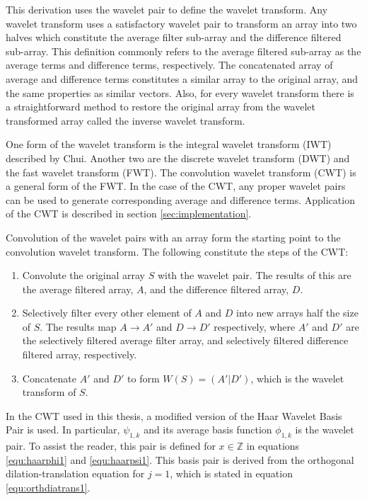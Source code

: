 This derivation uses the wavelet pair to define the wavelet transform.
Any wavelet transform uses a satisfactory wavelet pair to transform an
array into two halves which constitute the average filter sub-array
and the difference filtered sub-array.  This definition commonly
refers to the average filtered sub-array as the average terms and
difference terms, respectively.  The concatenated array of average and
difference terms constitutes a similar array to the original array,
and the same properties as similar vectors.  Also, for every wavelet
transform there is a straightforward method to restore the original
array from the wavelet transformed array called the inverse wavelet
transform.

One form of the wavelet transform is the integral wavelet transform
(IWT) described by Chui\cite{ChuiIntro}.  Another two are the discrete wavelet
transform (DWT) and the fast wavelet transform (FWT)\cite {walker, digital}.
  The convolution
wavelet transform (CWT) is a general form of the FWT.  In the case of
the CWT, any proper wavelet pairs can be used to generate corresponding
average and difference terms.  Application of the CWT is described in
section \ref{sec:implementation}.

Convolution of the wavelet pairs with an array form the starting point to the convolution wavelet transform.  The following constitute the steps of the CWT:
\begin{enumerate}
\item Convolute the original array $S$ with the wavelet pair.  The results of this are the average filtered array, $A$, and the difference filtered array, $D$.  
\item Selectively filter every other element of $A$ and $D$ into new arrays half the size of $S$.  The results map $A\to A'$ and $D\to D'$ respectively, where $A'$ and $D'$ are the selectively filtered average filter array, and selectively filtered difference filtered array, respectively.  
\item Concatenate $A'$ and $D'$ to form $W(S) = (A'|D')$, which is the wavelet transform of $S$.
\end{enumerate}

In the CWT used in this thesis, a modified version of the Haar Wavelet Basis Pair is used.   In particular, $\psi_{1,k}$ and its average basis function $\phi_{1,k}$ is the wavelet pair.  To assist the reader, this pair is defined for $x\in{\mathbb Z}$ in equations \ref{equ:haarphi1} and \ref{equ:haarpsi1}.  This basis pair is derived from the orthogonal dilation-translation equation for $j=1$, which is stated in equation \ref{equ:orthdiatrans1}.

